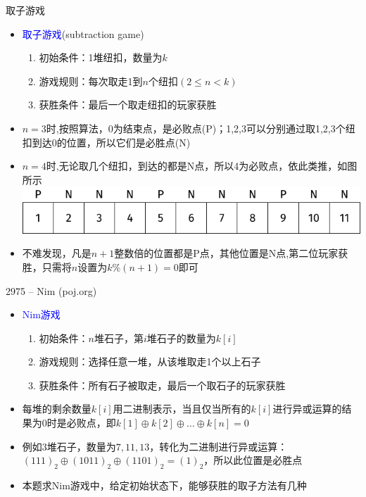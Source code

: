 \begin{frame}{取子游戏}
    \begin{itemize}
        \item \textcolor{blue}{取子游戏}(subtraction game)
        \begin{enumerate}[(1)]
            \item 初始条件：1堆纽扣，数量为$k$
            \item 游戏规则：每次取走1到$n$个纽扣$(2\leq n < k)$
            \item 获胜条件：最后一个取走纽扣的玩家获胜
        \end{enumerate}
        \item $n=3$时,按照算法，0为结束点，是必败点(P)；1,2,3可以分别通过取1,2,3个纽扣到达0的位置，所以它们是必胜点(N)
        \item $n=4$时,无论取几个纽扣，到达的都是N点，所以4为必败点，依此类推，如图所示
        \includegraphics[scale=.9]{fig/7-4.pdf}
        \item 不难发现，凡是$n+1$整数倍的位置都是P点，其他位置是N点,第二位玩家获胜，只需将$n$设置为$k\%(n+1)=0$即可   
    \end{itemize}
\end{frame}
\begin{frame}{2975 -- Nim (poj.org)}
    \begin{itemize}
        \item \textcolor{blue}{Nim游戏}
        \begin{enumerate}[(1)]
            \item 初始条件：$n$堆石子，第$i$堆石子的数量为$k[i]$
            \item 游戏规则：选择任意一堆，从该堆取走1个以上石子
            \item 获胜条件：所有石子被取走，最后一个取石子的玩家获胜
        \end{enumerate}
        \item 每堆的剩余数量$k[i]$用二进制表示，当且仅当所有的$k[i]$进行异或运算的结果为0时是必败点，即$k[1]\oplus k[2]\oplus \ldots \oplus k[n]=0$
        \item 例如3堆石子，数量为$7,11,13$，转化为二进制进行异或运算：$(111)_2\oplus (1011)_2\oplus (1101)_2=(1)_2$，所以此位置是必胜点
        \item 本题求Nim游戏中，给定初始状态下，能够获胜的取子方法有几种   
    \end{itemize}
\end{frame}
